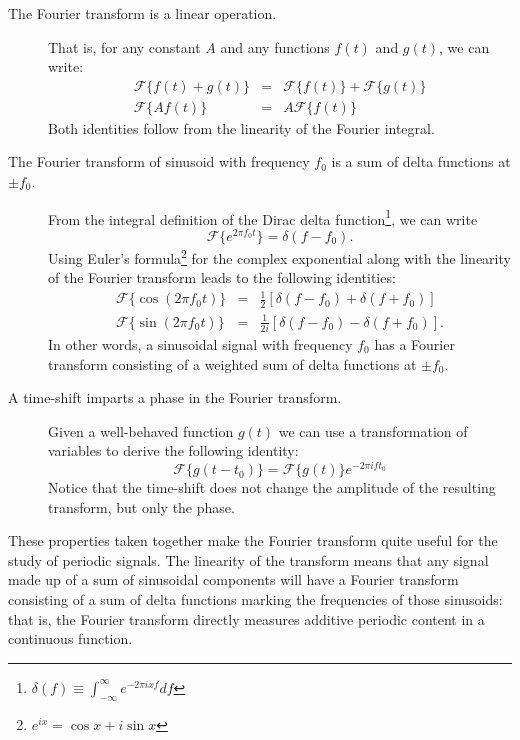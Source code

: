 \documentclass[preprint]{aastex}
\newcommand{\eqlabel}[1]{\label{eq:#1}}
\begin{document}
\begin{description}
   \item[The Fourier transform is a linear operation.]
     That is, for any constant $A$ and any functions $f(t)$ and $g(t)$,
     we can write:
     \begin{eqnarray}
       \mathcal{F}\{f(t) + g(t)\} &=& \mathcal{F}\{f(t)\} + \mathcal{F}\{g(t)\}\nonumber\\
       \mathcal{F}\{A f(t)\} &=& A\mathcal{F}\{f(t)\}
     \end{eqnarray}
     Both identities follow from the linearity of the Fourier integral.

   \item[The Fourier transform of sinusoid with frequency $f_0$ is a sum of delta functions at $\pm f_0$.]
     From the integral definition of the Dirac delta function\footnote{
       $\delta(f)\equiv\int_{-\infty}^\infty e^{-2\pi i x f}df$},
     we can write
     \begin{equation}
       \mathcal{F}\{e^{2\pi f_0 t}\} = \delta(f - f_0).
       \eqlabel{delta-FT}
     \end{equation}
     Using Euler's formula\footnote{$e^{ix} = \cos x + i\sin x$}
     for the complex exponential along with the linearity
     of the Fourier transform leads to the following identities:
     \begin{eqnarray}
       \mathcal{F}\{\cos(2\pi f_0 t)\} &=& \frac{1}{2}\left[\delta(f - f_0) + \delta(f + f_0)\right]\nonumber\\
       \mathcal{F}\{\sin(2\pi f_0 t)\} &=& \frac{1}{2i}\left[\delta(f - f_0) - \delta(f + f_0)\right].
     \end{eqnarray}
     In other words, a sinusoidal signal with frequency $f_0$ has a Fourier
     transform consisting of a weighted sum of delta functions at $\pm f_0$.

   \item[A time-shift imparts a phase in the Fourier transform.]
     Given a well-behaved function $g(t)$ we can use a transformation of
     variables to derive the following identity:
     \begin{equation}
       \mathcal{F}\{g(t - t_0)\} = \mathcal{F}\{g(t)\} e^{-2\pi i ft_0}
     \end{equation}
     Notice that the time-shift does not change the
     amplitude of the resulting transform, but only the phase.
\end{description}
These properties taken together make the Fourier transform quite useful for the study of periodic signals.
The linearity of the transform means that any signal made up of a sum of
sinusoidal components will have a Fourier transform consisting of a sum
of delta functions marking the frequencies of those sinusoids: that is,
the Fourier transform directly measures additive periodic content in a
continuous function.
\end{document}
